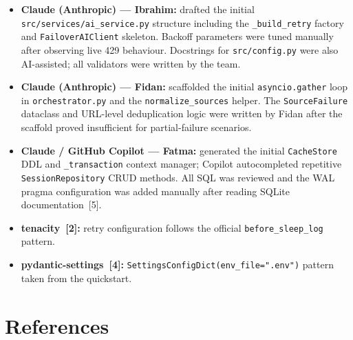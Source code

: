 \documentclass[11pt,a4paper]{article}
\begin{document}
\begin{itemize}[leftmargin=1.2em,itemsep=4pt]
  \item \textbf{Claude (Anthropic) --- Ibrahim:} drafted the initial \texttt{src/services/ai\_service.py} structure including the \texttt{\_build\_retry} factory and \texttt{FailoverAIClient} skeleton. Backoff parameters were tuned manually after observing live 429 behaviour. Docstrings for \texttt{src/config.py} were also AI-assisted; all validators were written by the team.
  \item \textbf{Claude (Anthropic) --- Fidan:} scaffolded the initial \texttt{asyncio.gather} loop in \texttt{orchestrator.py} and the \texttt{normalize\_sources} helper. The \texttt{SourceFailure} dataclass and URL-level deduplication logic were written by Fidan after the scaffold proved insufficient for partial-failure scenarios.
  \item \textbf{Claude / GitHub Copilot --- Fatma:} generated the initial \texttt{CacheStore} DDL and \texttt{\_transaction} context manager; Copilot autocompleted repetitive \texttt{SessionRepository} CRUD methods. All SQL was reviewed and the WAL pragma configuration was added manually after reading SQLite documentation~[5].
  \item \textbf{tenacity~[2]:} retry configuration follows the official \texttt{before\_sleep\_log} pattern.
  \item \textbf{pydantic-settings~[4]:} \texttt{SettingsConfigDict(env\_file=".env")} pattern taken from the quickstart.
\end{itemize}

\section*{References}
\end{document}
